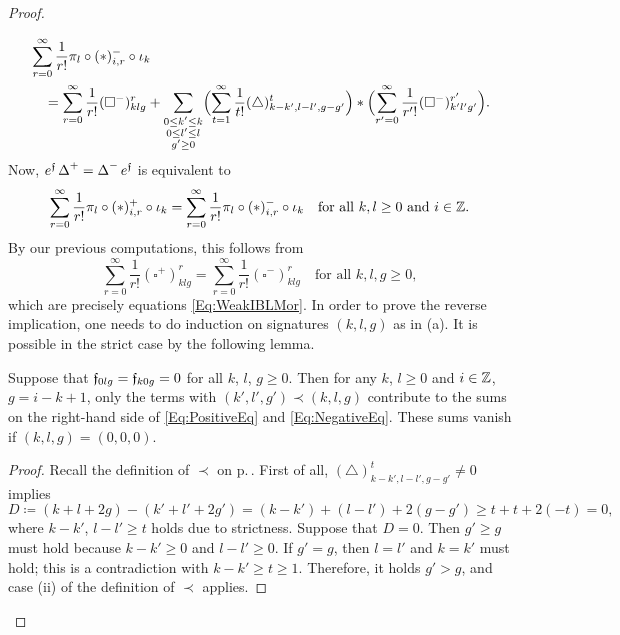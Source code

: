 \documentclass[\MainFolder/Text.tex]{subfiles}
\begin{document}
\begin{proof}
\begin{ProofList}
\begin{equation}
\begin{aligned}
&\sum_{r=0}^\infty \frac{1}{r!} \pi_l \circ (*)_{i,r}^- \circ \iota_k \\
&\quad = \sum_{r=0}^\infty \frac{1}{r!} (\square^-)_{klg}^r + \sum_{\substack{0\le k' \le k \\ 0\le l'\le l \\ g'\ge 0}}\Bigl(\sum_{t=1}^\infty \frac{1}{t!}(\triangle)_{k-k',l-l',g-g'}^{t}\Bigr)*\Bigl(\sum_{r' = 0}^\infty \frac{1}{r'!} (\square^-)_{k'l'g'}^{r'}\Bigr).
\end{aligned}\end{equation}
Now, $e^{\mathfrak{f}}\operatorname{\Delta}^+ = \operatorname{\Delta}^- e^{\mathfrak{f}}$ is equivalent to 
\begin{equation}\label{Eq:SequenceOfEquations}
\sum_{r=0}^\infty \frac{1}{r!} \pi_l \circ (*)^+_{i,r} \circ \iota_k = \sum_{r=0}^\infty \frac{1}{r!}\pi_l \circ (*)^-_{i,r} \circ \iota_k\quad\text{for all }k, l \ge 0\text{ and }i\in \mathbb{Z}.
\end{equation}
By our previous computations, this follows from
$$ \sum_{r=0}^\infty \frac{1}{r!} (\square^+)_{klg}^r = \sum_{r=0}^\infty \frac{1}{r!} (\square^-)_{klg}^r\quad \text{for all }k, l, g\ge 0, $$
which are precisely equations \eqref{Eq:WeakIBLMor}. In order to prove the reverse implication, one needs to do induction on signatures $(k,l,g)$ as in (a). It is possible in the strict case by the following lemma.
\begin{SubClaim}
Suppose that $\mathfrak{f}_{0lg} = \mathfrak{f}_{k0g} = 0$ for all $k$, $l$, $g\ge 0$. Then for any $k$, $l\ge 0$ and $i\in\mathbb{Z}$, $g=i-k+1$, only the terms with $(k',l',g')\prec(k,l,g)$ contribute to the sums on the right-hand side of \eqref{Eq:PositiveEq} and \eqref{Eq:NegativeEq}. These sums vanish if $(k,l,g) = (0,0,0)$.
\end{SubClaim}
\begin{proof}
Recall the definition of $\prec$ on p.\,\pageref{Enum:OrderingOfSignatures}. First of all, $(\triangle)_{k-k',l-l',g-g'}^t \neq 0$ implies
$$ D\coloneqq (k+l+2g) - (k' + l' + 2 g') = (k-k') + (l-l') + 2(g-g') \ge t + t + 2(-t) = 0, $$
where $k-k'$, $l-l'\ge t$ holds due to strictness. Suppose that $D=0$. Then $g'\ge g$ must hold because $k-k'\ge 0$ and $l-l'\ge 0$. If $g'=g$, then $l=l'$ and $k=k'$ must hold; this is a contradiction with $k-k'\ge t \ge 1$. Therefore, it holds $g'>g$, and case (ii) of the definition of $\prec$ applies.


\end{proof}
\end{ProofList}
\end{proof}
\end{document}
